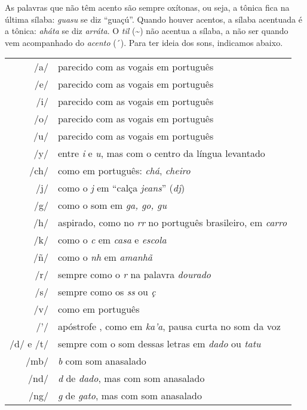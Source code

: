 As palavras que não têm acento são sempre oxítonas, ou seja, a tônica
fica na última sílaba: \textit{guasu} se diz ``guaçú''. Quando houver
acentos, a sílaba acentuada é a tônica: \textit{aháta} se diz
\textit{arráta}. O \textit{til} (\textasciitilde{}) não acentua a sílaba, a não ser
quando vem acompanhado do \textit{acento} (´). Para ter ideia dos sons, indicamos abaixo.

\bigskip

\begingroup%
\begin{tabular}{rl}
/a/ & parecido com as vogais em português\\
/e/ & parecido com as vogais em português\\
/i/ & parecido com as vogais em português\\
/o/ & parecido com as vogais em português\\
/u/ & parecido com as vogais em português\\
/y/ & entre \textit{i} e \textit{u}, mas com o centro da língua levantado\\
/ch/ & como em português: \textit{chá}, \textit{cheiro}\\
/j/ & como o \textit{j} em ``calça \textit{jeans}'' (\textit{dj})\\
/g/ & como o som em \textit{ga, go, gu }\\
/h/ & aspirado, como no \textit{rr} no português brasileiro, em \textit{carro}\\
/k/ & como o \textit{c} em \textit{casa} e \textit{escola}\\
/ñ/ & como o \textit{nh} em \textit{amanhã}\\
/r/ & sempre como o \textit{r} na palavra \textit{dourado}\\
/s/ & sempre como os \textit{ss} ou \textit{ç}\\
/v/ & como em português\\
/'/ & apóstrofe , como em \textit{ka'a}, pausa curta no som da voz\\
/d/ e /t/ & sempre com o som dessas letras em \textit{dado} ou \textit{tatu}\\
/mb/ & \textit{b} com som anasalado\\
/nd/ & \textit{d} de \textit{dado}, mas com som anasalado\\
/ng/ & \textit{g} de \textit{gato}, mas com som anasalado
\end{tabular}
\endgroup






